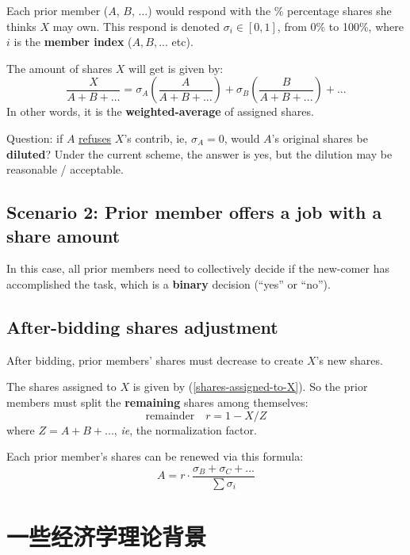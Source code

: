 \documentclass[12pt, orivec]{article}
\newcommand{\cc}[2]{#1}
\newcommand{\cc}[2]{#2}
\begin{document}
Each prior member ($A$, $B$, ...) would respond with the \% percentage shares she thinks $X$ may own.  This respond is denoted $\sigma_i \in [0,1]$, from 0\% to 100\%, where $i$ is the \textbf{member index} ($A, B, ... $ etc).

The amount of shares $X$ will get is given by:
\begin{equation}
\label{shares-assigned-to-X}
\frac{X}{A + B + ...} = \sigma_A (\frac{A}{A + B + ...}) + \sigma_B (\frac{B}{A + B + ...}) + ...
\end{equation}
In other words, it is the \textbf{weighted-average} of assigned shares.

Question:  if $A$ \uline{refuses} $X$'s contrib, ie, $\sigma_A = 0$, would $A$'s original shares be \textbf{diluted}?  Under the current scheme, the answer is yes, but the dilution may be reasonable / acceptable.

\secttoc
\subsection{Scenario 2:  Prior member offers a job with a share amount}

In this case, all prior members need to collectively decide if the new-comer has accomplished the task, which is a \textbf{binary} decision (``yes'' or ``no'').

\secttoc
\subsection{After-bidding shares adjustment}

After bidding, prior members' shares must decrease to create $X$'s new shares.

The shares assigned to $X$ is given by (\ref{shares-assigned-to-X}).  So the prior members must split the \textbf{remaining} shares among themselves:
\begin{equation}
\boxed{\mbox{remainder}} \quad r = 1 - X / Z
\end{equation}
where $Z = A + B + ...$, \textit{ie}, the normalization factor.

Each prior member's shares can be renewed via this formula:
\begin{equation}
A = r \cdot \frac{\sigma_B + \sigma_C + ...}{\sum \sigma_i}
\end{equation}

\secttoc
\section{\cc{一些经济学理论背景}{Some economic-theoretical background}}
\end{document}
